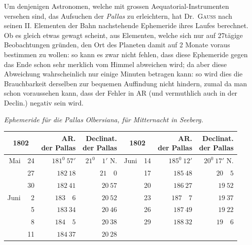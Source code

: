 Um denjenigen Astronomen, welche mit grossen Aequatorial-Instrumenten versehen sind, das Aufsuchen der \textit{Pallas} zu erleichtern, hat Dr.\ \textsc{Gauss} nach seinen II. Elementen der Bahn nachstehende Ephemeride ihres Laufes berechnet. Ob es gleich etwas gewagt scheint, aus Elementen, welche sich nur auf 27tägige Beobachtungen gründen, den Ort des Planeten damit auf 2 Monate voraus bestimmen zu wollen: so kann es zwar nicht fehlen, dass diese Ephemeride gegen das Ende schon sehr merklich vom Himmel abweichen wird; da aber diese Abweichung wahrscheinlich nur einige Minuten betragen kann: so wird dies die Brauchbarkeit derselben zur bequemen Auffindung nicht hindern, zumal da man schon voraussehen kann, dass der Fehler in AR (und vermuthlich auch in der Declin.) negativ sein wird.
\begin{center}
\textit{Ephemeride für die Pallas Olbersiana, für Mitternacht in Seeberg.}\par\medskip
{\small\setlength{\tabcolsep}{5pt}
\begin{tabular}{r r|r|r@{\qquad}r r|r|r}
\multicolumn{2}{c|}{1802}&\shortstack{AR.\\der Pallas}&\shortstack{Declinat.\\der Pallas}&\multicolumn{2}{c|}{1802}&\shortstack{AR.\\der Pallas}&\shortstack{Declinat.\\der Pallas}\\\hline
Mai&24&$181^0\ 57'$&$21^0\quad1'$ N.&Juni&14&$185^0\ 12'$&$20^0\ 17'$ N.\\
&27&$182\ 18$&$21\quad0$&&17&$185\ 48$&$20\quad5$\\
&30&$182\ 41$&$20\ 57$&&20&$186\ 27$&$19\ 52$\\
Juni&2&$183\quad6$&$20\ 52$&&23&$187\quad7$&$19\ 37$\\
&5&$183\ 34$&$20\ 46$&&26&$187\ 49$&$19\ 22$\\
&8&$184\quad5$&$20\ 38$&&29&$188\ 32$&$19\quad6$\\
&11&$184\ 37$&$20\ 28$&&&&
\end{tabular}}
\end{center}
\begin{flushright}\end{flushright}
